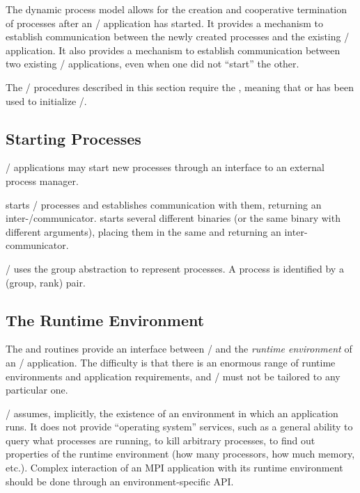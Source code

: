 The
dynamic
process model allows for the creation and
cooperative termination of processes after an \MPI/ application has started.
It provides a mechanism to establish communication between
the newly created processes and the existing \MPI/ application.
It also provides a mechanism to establish communication between
two existing \MPI/ applications, even when one did not ``start'' the
other.

The \mpi/ procedures described in this section require the \wpm{}, meaning that  or   has been used to initialize \mpi/.

\subsection{Starting Processes}

\MPI/ applications may start new processes through an interface to an external process manager.

starts \MPI/ processes and establishes communication with them,
returning an inter\hyphen/communicator.
starts several different binaries (or the same binary with
different arguments), placing them in the same
 and returning an inter-communicator.

\MPI/ uses the group abstraction to represent processes.
A process is identified by a (group, rank) pair.


\subsection{The Runtime Environment}

The  and
routines provide an interface between \MPI/ and
the \emph{runtime environment} of an \MPI/ application.
The difficulty is that there is an enormous range of runtime
environments and application requirements, and \MPI/ must not be
tailored to any particular one.

\MPI/ assumes, implicitly, the existence of an environment in which an
application runs. It does not provide ``operating system'' services,
such as a general ability to query what processes are running, to kill
arbitrary processes, to find out properties of the runtime environment
(how many processors, how much memory, etc.).  Complex interaction of an
MPI application with its runtime environment should
be done through an environment-specific API.

